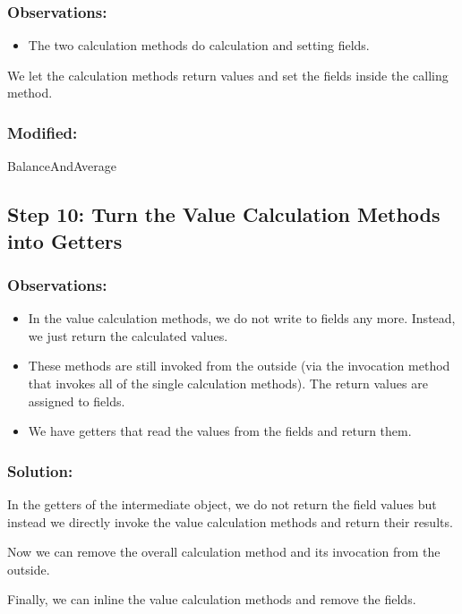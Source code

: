 \documentclass[a4paper,fleqn,titlepage,11pt]{article}
\begin{document}
\subsubsection*{Observations:}
\begin{itemize}
\item The two calculation methods do calculation and setting fields. 
\end{itemize}

We let the calculation methods return values and set the fields inside the calling method.

\subsubsection*{Modified:}

BalanceAndAverage

\subsection*{Step 10: Turn the Value Calculation Methods into Getters}

\subsubsection*{Observations:}
\begin{itemize}
\item In the value calculation methods, we do not write to fields any more. Instead, we just return the calculated values.
\item These methods are still invoked from the outside (via the invocation method that invokes all of the single calculation methods). The return values are assigned to fields.
\item We have getters that read the values from the fields and return them.
\end{itemize}

\subsubsection*{Solution:}

In the getters of the intermediate object, we do not return the field values but instead we directly invoke the value calculation methods and return their results.

Now we can remove the overall calculation method and its invocation from the outside.

Finally, we can inline the value calculation methods and remove the fields.
\end{document}
